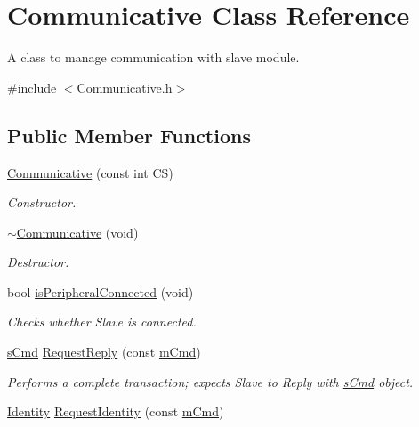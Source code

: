 \hypertarget{class_communicative}{}\section{Communicative Class Reference}
\label{class_communicative}


A class to manage communication with slave module.  




{\ttfamily \#include $<$Communicative.\+h$>$}

\subsection*{Public Member Functions}
\begin{DoxyCompactItemize}
\item 
\mbox{\hyperlink{class_communicative_aa92e21c2c2b3ee8dda993872f6b0c73a}{Communicative}} (const int CS)
\begin{DoxyCompactList}\small\item\em Constructor. \end{DoxyCompactList}\item 
\mbox{\hyperlink{class_communicative_a53c7f2ec58bfb99f0ea10e238705c3ce}{$\sim$\+Communicative}} (void)
\begin{DoxyCompactList}\small\item\em Destructor. \end{DoxyCompactList}\item 
bool \mbox{\hyperlink{class_communicative_ac3d11fc6a7b276a19b1d92cd19e9a046}{is\+Peripheral\+Connected}} (void)
\begin{DoxyCompactList}\small\item\em Checks whether Slave is connected. \end{DoxyCompactList}\item 
\mbox{\hyperlink{structs_cmd}{s\+Cmd}} \mbox{\hyperlink{class_communicative_a4fe112ad5a3d693e39ae44dd43eaf0c1}{Request\+Reply}} (const \mbox{\hyperlink{structm_cmd}{m\+Cmd}})
\begin{DoxyCompactList}\small\item\em Performs a complete transaction; expects Slave to Reply with \mbox{\hyperlink{structs_cmd}{s\+Cmd}} object. \end{DoxyCompactList}\item 
\mbox{\hyperlink{struct_identity}{Identity}} \mbox{\hyperlink{class_communicative_a01ee3d76d85bad6123c4d4f6262c6c2d}{Request\+Identity}} (const \mbox{\hyperlink{structm_cmd}{m\+Cmd}})

\end{DoxyCompactItemize}
